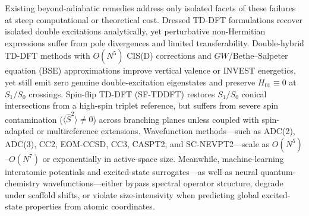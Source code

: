 \documentclass[10pt,twocolumn]{article}
\theoremstyle{natthm}
\newcommand{\Ssq}{\langle\hat{S}^2\rangle}
\begin{document}
Existing beyond-adiabatic remedies address only isolated facets of these failures at steep computational or theoretical cost.
Dressed TD-DFT formulations\cite{maitra2004,cave2004,romaniello2009,sangalli2011,huixrotllant2011,elliott2011,maitra2022} recover isolated double excitations analytically, yet perturbative non-Hermitian expressions suffer from pole divergences and limited transferability.
Double-hybrid TD-DFT methods with $O(N^5)$ CIS(D) corrections\cite{headgordon1994,grimme2007,casanovapaez2021,sanchogarcia2022,tuckova2022,blaskovits2023} and $GW$/Bethe--Salpeter equation (BSE) approximations\cite{blase2018,loos2020bse} improve vertical valence or INVEST energetics, yet still emit zero genuine double-excitation eigenstates and preserve $H_{01}\equiv 0$ at $S_1/S_0$ crossings.
Spin-flip TD-DFT (SF-TDDFT)\cite{krylov2001sf,shao2003sftddft,minezawa2009sfci,casanova2020sf} restores $S_1/S_0$ conical intersections from a high-spin triplet reference, but suffers from severe spin contamination ($\Ssq\ne 0$) across branching planes unless coupled with spin-adapted or multireference extensions\cite{zhang2015sfsa}.
Wavefunction methods---such as ADC(2), ADC(3), CC2, EOM-CCSD, CC3, CASPT2, and SC-NEVPT2\cite{schirmer1982,trofimov1995,harbach2014adc3,dreuw2015adc,stanton1993eom,christiansen1995cc2,christiansen1997cc3,hattig2000ricc2,andersson1992caspt2,angeli2001nevpt2}---scale as $O(N^5)$--$O(N^7)$ or exponentially in active-space size.
Meanwhile, machine-learning interatomic potentials and excited-state surrogates\cite{schutt2018schnet,schutt2019schnorb,westermayr2020schnarc,westermayr2021review,dral2021ml,unke2021mlff,batzner2022nequip,batatia2022mace,li2022deeph}---as well as neural quantum-chemistry wavefunctions\cite{hermann2020paulinet,pfau2020ferminet}---either bypass spectral operator structure, degrade under scaffold shifts\cite{minot2026}, or violate size-intensivity when predicting global excited-state properties from atomic coordinates.
\end{document}
